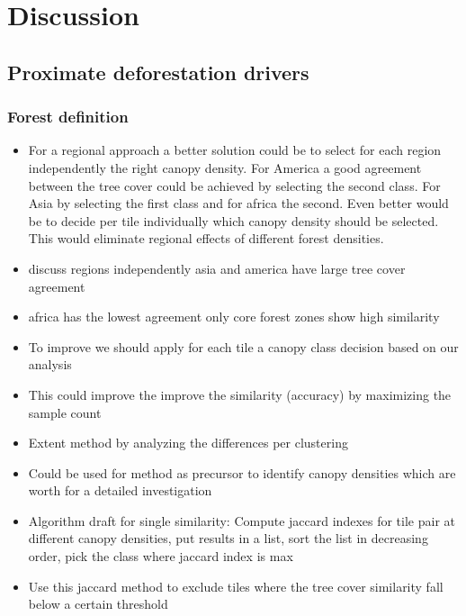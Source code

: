 \chapter{Discussion}
\label{ch:discussion}
	\section{Proximate deforestation drivers}
	\label{sec:discussion_deforestation}

		\subsection{Forest definition}
		\label{subsec:discussion_forest_definition}
			\begin{itemize}
				\item For a regional approach a better solution could be to select for each region independently the right canopy density. For America a good agreement between the tree cover could be achieved by selecting the second class. For Asia by selecting the first class and for africa the second. Even better would be to decide per tile individually which canopy density should be selected. This would eliminate regional effects of different forest densities.
				\item discuss regions independently asia and america have large tree cover agreement
				\item africa has the lowest agreement only core forest zones show high similarity
				\item To improve we should apply for each tile a canopy class decision based on our analysis
				\item This could improve the improve the similarity (accuracy) by maximizing the sample count
				\item Extent method by analyzing the differences per clustering
				\item Could be used for \citeauthor{Sannier2016} method as precursor to identify canopy densities which are worth for a detailed investigation
				\item Algorithm draft for single similarity: Compute jaccard indexes for tile pair at different canopy densities, put results in a list, sort the list in decreasing order, pick the class where jaccard index is max
				\item Use this jaccard method to exclude tiles where the tree cover similarity fall below a certain threshold
			\end{itemize}

